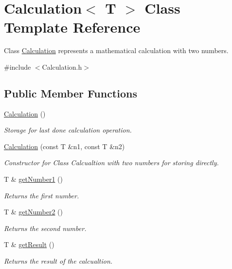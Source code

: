 \hypertarget{class_calculation}{}\section{Calculation$<$ T $>$ Class Template Reference}
\label{class_calculation}


Class \mbox{\hyperlink{class_calculation}{Calculation}} represents a mathematical calculation with two numbers.  




{\ttfamily \#include $<$Calculation.\+h$>$}

\subsection*{Public Member Functions}
\begin{DoxyCompactItemize}
\item 
\mbox{\hyperlink{class_calculation_a2e43307f8d5565b318b92f6a23dd49ff}{Calculation}} ()
\begin{DoxyCompactList}\small\item\em Storage for last done calculation operation. \end{DoxyCompactList}\item 
\mbox{\hyperlink{class_calculation_aad88cc7f771150b7ef24aed69380da50}{Calculation}} (const T \&n1, const T \&n2)
\begin{DoxyCompactList}\small\item\em Constructor for Class Calcualtion with two numbers for storing directly. \end{DoxyCompactList}\item 
T \& \mbox{\hyperlink{class_calculation_af094cbf10d94708d842e92eb290719ab}{get\+Number1}} ()
\begin{DoxyCompactList}\small\item\em Returns the first number. \end{DoxyCompactList}\item 
T \& \mbox{\hyperlink{class_calculation_a678dfb83b5746a5c882107081726b605}{get\+Number2}} ()
\begin{DoxyCompactList}\small\item\em Returns the second number. \end{DoxyCompactList}\item 
T \& \mbox{\hyperlink{class_calculation_ada3a3ff5f33f3c2b6eba7d076d2ada5b}{get\+Result}} ()
\begin{DoxyCompactList}\small\item\em Returns the result of the calcualtion. \end{DoxyCompactList}\item 

\end{DoxyCompactItemize}
